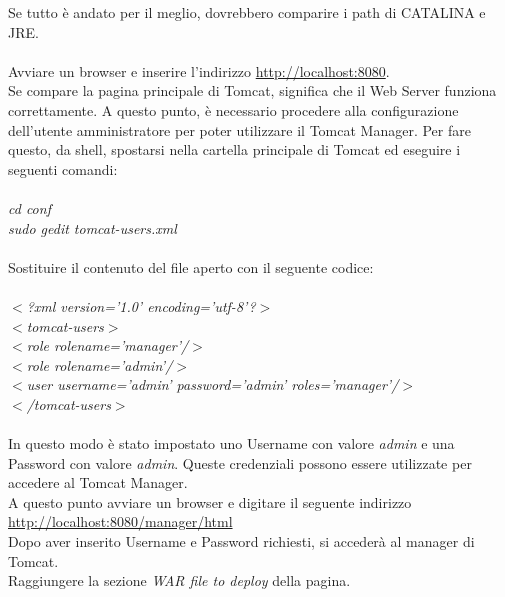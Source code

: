 Se tutto \`e andato per il meglio, dovrebbero comparire i path di CATALINA e JRE.\\
\\
Avviare un browser e inserire l'indirizzo \href{http://localhost:8080}{http://localhost:8080}.\\
Se compare la pagina principale di Tomcat, significa che il Web Server funziona correttamente.
A questo punto, \`e necessario procedere alla configurazione dell'utente amministratore per poter utilizzare il Tomcat Manager.
Per fare questo, da shell, spostarsi nella cartella principale di Tomcat ed eseguire i seguenti comandi:\\
\\
\textit{cd conf}\\
\textit{sudo gedit tomcat-users.xml}\\
\\
Sostituire il contenuto del file aperto con il seguente codice:\\
\\
\textit{$ < $?xml version='1.0' encoding='utf-8'?$ > $}\\
\textit{$ < $tomcat-users$ > $}\\
\textit{  $ < $role rolename='manager'/$ > $}\\
\textit{  $ < $role rolename='admin'/$ > $}\\
\textit{  $ < $user username='admin' password='admin' roles='manager'/$ > $}\\
\textit{$ < $/tomcat-users$ > $} \\
\\
In questo modo \`e stato impostato uno Username con valore \textit{admin} e una Password con valore \textit{admin}. Queste credenziali possono essere utilizzate per accedere al Tomcat Manager.\\
A questo punto avviare un browser e digitare il seguente indirizzo\\ \href{http://localhost:8080/manager/html}{http://localhost:8080/manager/html}\\
Dopo aver inserito Username e Password richiesti, si acceder\` a al manager di Tomcat.\\
Raggiungere la sezione \textit{WAR file to deploy} della pagina.

